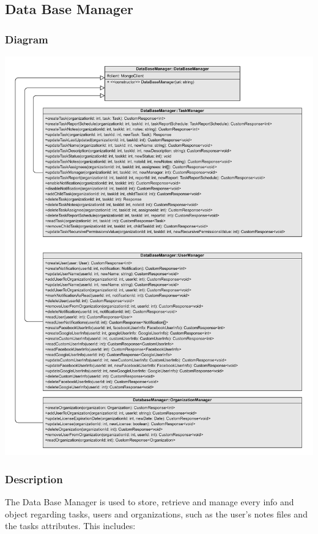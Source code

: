 \documentclass{article}
\begin{document}
\subsection{Data Base Manager} %

\subsubsection{Diagram}

\includegraphics[width=\textwidth,height=\textheight,keepaspectratio]{images/class_diagram/database_manager.jpg}

\subsubsection{Description}

The Data Base Manager is used to store, retrieve and manage every info and object regarding tasks, users and organizations, such as the user's notes files and the tasks attributes.
This includes:
\end{document}
